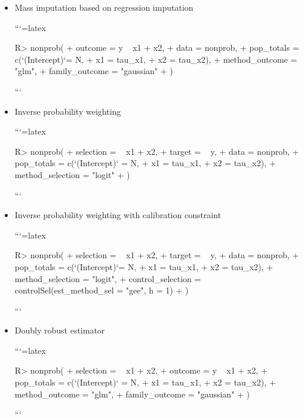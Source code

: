 \documentclass[
]{jss}
\begin{document}
\begin{itemize}
\item Mass imputation based on regression imputation

```{=latex}
\begin{CodeChunk}
\begin{CodeInput}
R> nonprob(
+   outcome = y ~ x1 + x2,
+   data = nonprob,
+   pop_totals = c(`(Intercept)`= N,
+                  x1 = tau_x1,
+                  x2 = tau_x2),
+   method_outcome = "glm",
+   family_outcome = "gaussian"
+ )
\end{CodeInput}
\end{CodeChunk}
```

\item Inverse probability weighting

```{=latex}
\begin{CodeChunk}
\begin{CodeInput}
R> nonprob(
+   selection =  ~ x1 + x2, 
+   target = ~ y, 
+   data = nonprob, 
+   pop_totals = c(`(Intercept)` = N, 
+                  x1 = tau_x1, 
+                  x2 = tau_x2), 
+   method_selection = "logit"
+ )
\end{CodeInput}
\end{CodeChunk}
```

\item Inverse probability weighting with calibration constraint

```{=latex}
\begin{CodeChunk}
\begin{CodeInput}
R> nonprob(
+   selection =  ~ x1 + x2, 
+   target = ~ y, 
+   data = nonprob, 
+   pop_totals = c(`(Intercept)`= N, 
+                  x1 = tau_x1, 
+                  x2 = tau_x2), 
+   method_selection = "logit", 
+   control_selection = controlSel(est_method_sel = "gee", h = 1)
+ )
\end{CodeInput}
\end{CodeChunk}
```

\item Doubly robust estimator

```{=latex}
\begin{CodeChunk}
\begin{CodeInput}
R> nonprob(
+   selection = ~ x1 + x2, 
+   outcome = y ~ x1 + x2, 
+   pop_totals = c(`(Intercept)` = N, 
+                  x1 = tau_x1, 
+                  x2 = tau_x2), 
+   method_outcome = "glm", 
+   family_outcome = "gaussian"
+ )
\end{CodeInput}
\end{CodeChunk}
```

\end{itemize}
\end{document}
